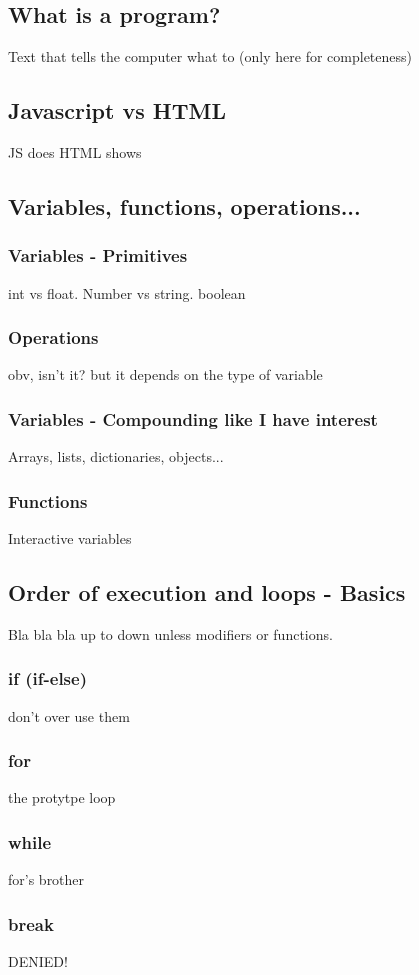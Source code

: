 \subsection{What is a program?}
Text that tells the computer what to (only here for completeness)
\subsection{Javascript vs HTML}
JS does
HTML shows
\subsection{Variables, functions, operations...}
    \subsubsection{Variables - Primitives}
int vs float. Number vs string. boolean
    \subsubsection{Operations}
obv, isn't it? but it depends on the type of variable
    \subsubsection{Variables - Compounding like I have interest}
Arrays, lists, dictionaries, objects...
    \subsubsection{Functions}
Interactive variables
\subsection{Order of execution and loops - Basics}
Bla bla bla up to down unless modifiers or functions.
    \subsubsection{if (if-else)}
don't over use them
    \subsubsection{for}
the protytpe loop
    \subsubsection{while}
for's brother
    \subsubsection{break}
DENIED!

